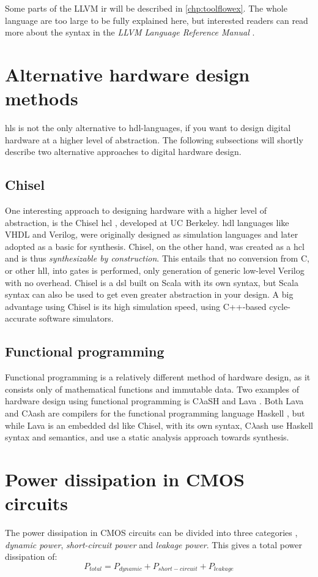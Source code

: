 Some parts of the LLVM \gls{ir} will be described in \cref{chp:toolflowex}. The whole language are too large to be fully explained here, but interested readers can read more about the syntax in the \textit{LLVM Language Reference Manual} \cite{llvmlangman}.

\section{Alternative hardware design methods}
\gls{hls} is not the only alternative to \gls{hdl}-languages, if you want to design digital hardware at a higher level of abstraction. The following subsections will shortly describe two alternative approaches to digital hardware design. 
\subsection{Chisel}
One interesting approach to designing hardware with a higher level of abstraction, is the Chisel \gls{hcl} \cite{bachrach2012chisel}, developed at UC Berkeley. \gls{hdl} languages like VHDL and Verilog, were originally designed as simulation languages and later adopted as a basic for synthesis. Chisel, on the other hand, was created as a \gls{hcl} and is thus \textit{synthesizable by construction}. This entails that no conversion from C, or other \gls{hll}, into gates is performed, only generation of generic low-level Verilog with no overhead. Chisel is a \gls{dsl} built on Scala \cite{odersky2004overview} with its own syntax, but Scala syntax can also be used to get even greater abstraction in your design. A big advantage using Chisel is its high simulation speed, using C++-based cycle-accurate software simulators.

\subsection{Functional programming}
Functional programming is a relatively different method of hardware design, as it consists only of mathematical functions and immutable data. Two examples of hardware design using functional programming is C$\lambda$aSH \cite{baaij2009clash} and Lava \cite{bjesse1998lava}. Both Lava and C$\lambda$ash are compilers for the functional programming language Haskell \cite{haskellonline}, but while Lava is an embedded \gls{dsl} like Chisel, with its own syntax, C$\lambda$ash use Haskell syntax and semantics, and use a static analysis approach towards synthesis.

\section{\label{sec:powdiss}Power dissipation in CMOS circuits}
The power dissipation in CMOS circuits can be divided into three categories \cite{panda2010power}, \textit{dynamic power}, \textit{short-circuit power} and \textit{leakage power}. This gives a total power dissipation of:
\begin{equation}
    P_{total} = P_{dynamic} + P_{short-circuit} + P_{leakage}
\end{equation}

